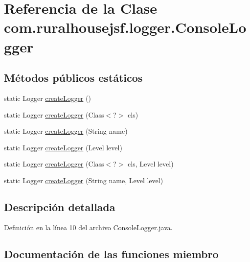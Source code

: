 \hypertarget{classcom_1_1ruralhousejsf_1_1logger_1_1_console_logger}{}\section{Referencia de la Clase com.\+ruralhousejsf.\+logger.\+Console\+Logger}
\label{classcom_1_1ruralhousejsf_1_1logger_1_1_console_logger}
\subsection*{Métodos públicos estáticos}
\begin{DoxyCompactItemize}
\item 
static Logger \mbox{\hyperlink{classcom_1_1ruralhousejsf_1_1logger_1_1_console_logger_a520321643663e37d95761134a35505cd}{create\+Logger}} ()
\item 
static Logger \mbox{\hyperlink{classcom_1_1ruralhousejsf_1_1logger_1_1_console_logger_a7260bb499fc46999ae7c583aa7227a9e}{create\+Logger}} (Class$<$?$>$ cls)
\item 
static Logger \mbox{\hyperlink{classcom_1_1ruralhousejsf_1_1logger_1_1_console_logger_aede603ef1d6e7732ebc86740306a0d76}{create\+Logger}} (String name)
\item 
static Logger \mbox{\hyperlink{classcom_1_1ruralhousejsf_1_1logger_1_1_console_logger_ac2b1539989c5ffe217126480d0cd1d0f}{create\+Logger}} (Level level)
\item 
static Logger \mbox{\hyperlink{classcom_1_1ruralhousejsf_1_1logger_1_1_console_logger_aff02e8e2cb59129f6cd218d251f999af}{create\+Logger}} (Class$<$?$>$ cls, Level level)
\item 
static Logger \mbox{\hyperlink{classcom_1_1ruralhousejsf_1_1logger_1_1_console_logger_ab24910a5c796c6dd0a686067a856febd}{create\+Logger}} (String name, Level level)
\end{DoxyCompactItemize}


\subsection{Descripción detallada}


Definición en la línea 10 del archivo Console\+Logger.\+java.



\subsection{Documentación de las funciones miembro}
\mbox{\label{classcom_1_1ruralhousejsf_1_1logger_1_1_console_logger_a520321643663e37d95761134a35505cd}} 
